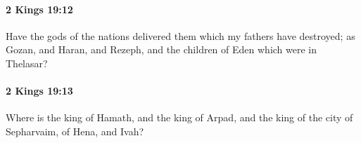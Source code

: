 		\paragraph{2 Kings 19:12} %
			\label{2KINGS-19-12}

			Have the gods of the nations delivered them which my fathers have destroyed; as Gozan, and Haran, and Rezeph, and the children of Eden which were in Thelasar?


		\paragraph{2 Kings 19:13} %
			\label{2KINGS-19-13}

			Where is the king of Hamath, and the king of Arpad, and the king of the city of Sepharvaim, of Hena, and Ivah?


